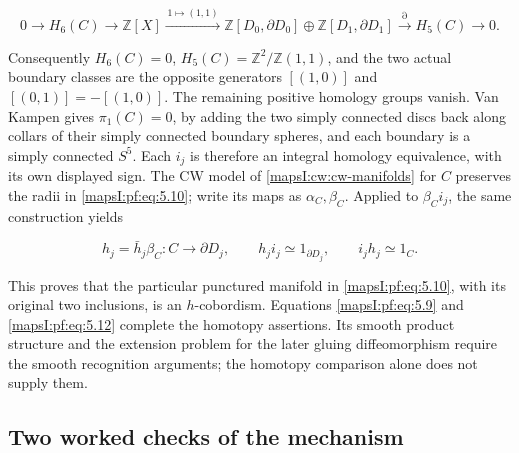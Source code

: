 \begin{equation}
0\longrightarrow H_6(C)\longrightarrow
\mathbb Z[X]\xrightarrow{\,1\mapsto(1,1)\,}
\mathbb Z[D_0,\partial D_0]\oplus\mathbb Z[D_1,\partial D_1]
\xrightarrow{\partial}H_5(C)\longrightarrow0.
\label{mapsI:pf:eq:5.11}
\end{equation}

Consequently \(H_6(C)=0\), \(H_5(C)=\mathbb Z^2/\mathbb Z(1,1)\), and the two actual boundary classes are the opposite generators \([(1,0)]\) and \([(0,1)]=-[(1,0)]\). The remaining positive homology groups vanish. Van Kampen gives \(\pi_1(C)=0\), by adding the two simply connected discs back along collars of their simply connected boundary spheres, and each boundary is a simply connected \(S^5\). Each \(i_j\) is therefore an integral homology equivalence, with its own displayed sign. The CW model of \cref{mapsI:cw:cw-manifolds} for \(C\) preserves the radii in \eqref{mapsI:pf:eq:5.10}; write its maps as \(\alpha_C,\beta_C\). Applied to \(\beta_Ci_j\), the same construction yields

\begin{equation}
h_j=\bar h_j\beta_C:C\to\partial D_j,\qquad
h_ji_j\simeq1_{\partial D_j},\qquad i_jh_j\simeq1_C.
\label{mapsI:pf:eq:5.12}
\end{equation}

This proves that the particular punctured manifold in \eqref{mapsI:pf:eq:5.10}, with its original two inclusions, is an \(h\)-cobordism. Equations \eqref{mapsI:pf:eq:5.9} and \eqref{mapsI:pf:eq:5.12} complete the homotopy assertions. Its smooth product structure and the extension problem for the later gluing diffeomorphism require the smooth recognition arguments; the homotopy comparison alone does not supply them.

\subsection{Two worked checks of the mechanism}
\label{mapsI:pf:path-fibre-exercises}

